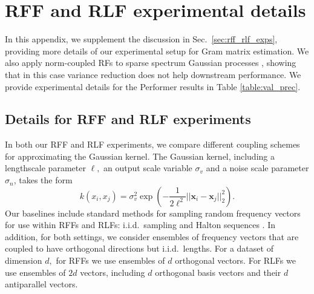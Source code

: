 \section{RFF and RLF experimental details} \label{app:rff_and_rlf_expts}
In this appendix, we supplement the discussion in Sec.~\ref{sec:rff_rlf_exps}, providing more details of our experimental setup for Gram matrix estimation.
We also apply norm-coupled RFs to sparse spectrum Gaussian processes \citep{lazaro2010sparse}, showing that in this case variance reduction does not help downstream performance.
We provide experimental details for the Performer \citep{choromanski2020rethinking} results in Table \ref{table:val_prec}.




\subsection{Details for RFF and RLF experiments} \label{app:rff_rlf_expt_details}

In both our RFF and RLF experiments, we compare different coupling schemes for approximating the Gaussian kernel.
The Gaussian kernel, including a lengthscale parameter $\ell,$ an output scale variable $\sigma_v$ and a noise scale parameter $\sigma_n$, takes the form
$$k(x_i, x_j) = \sigma_v^2 \exp\left(-\frac{1}{2 \ell^2} ||\boldsymbol{x}_i - \boldsymbol{x}_j||_2^2\right).$$
Our baselines include standard methods for sampling random frequency vectors for use within RFFs and RLFs: i.i.d.~sampling and Halton sequences \citep{halton1960efficiency}.
In addition, for both settings, we consider ensembles of frequency vectors that are coupled to have orthogonal directions but i.i.d.~lengths.
For a dataset of dimension $d,$ for RFFs we use ensembles of $d$ orthogonal vectors.
For RLFs we use ensembles of $2d$ vectors, including $d$ orthogonal basis vectors and their $d$ antiparallel vectors.


